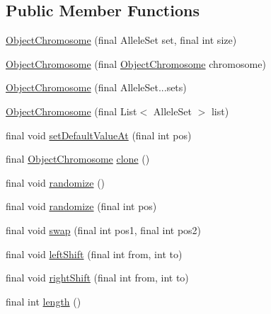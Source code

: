 \subsection*{Public Member Functions}
\begin{DoxyCompactItemize}
\item 
\hyperlink{classjenes_1_1chromosome_1_1_object_chromosome_a5af7d34bc1f7260dca1dc5c38135f4a4}{Object\-Chromosome} (final Allele\-Set set, final int size)
\item 
\hyperlink{classjenes_1_1chromosome_1_1_object_chromosome_a59e25d20fb54d53ff2b4adc53177d7d2}{Object\-Chromosome} (final \hyperlink{classjenes_1_1chromosome_1_1_object_chromosome}{Object\-Chromosome} chromosome)
\item 
\hyperlink{classjenes_1_1chromosome_1_1_object_chromosome_aba090ada4d0f24caaf6f68cfed7800f0}{Object\-Chromosome} (final Allele\-Set...\-sets)
\item 
\hyperlink{classjenes_1_1chromosome_1_1_object_chromosome_aa6c8dcc77a9129f9634ea02f19d5a968}{Object\-Chromosome} (final List$<$ Allele\-Set $>$ list)
\item 
final void \hyperlink{classjenes_1_1chromosome_1_1_object_chromosome_ad4b8a3ca38d15a8170b63464149b37aa}{set\-Default\-Value\-At} (final int pos)
\item 
final \hyperlink{classjenes_1_1chromosome_1_1_object_chromosome}{Object\-Chromosome} \hyperlink{classjenes_1_1chromosome_1_1_object_chromosome_a4aa8eeaac6a20b30c260bfda00c78fe2}{clone} ()
\item 
final void \hyperlink{classjenes_1_1chromosome_1_1_object_chromosome_a26a9d9d7eb049ff88c3321728fd9de07}{randomize} ()
\item 
final void \hyperlink{classjenes_1_1chromosome_1_1_object_chromosome_aac077d08ae00b9805797d5848a10c1f4}{randomize} (final int pos)
\item 
final void \hyperlink{classjenes_1_1chromosome_1_1_object_chromosome_af85db410fecd769993c248f94396dd53}{swap} (final int pos1, final int pos2)
\item 
final void \hyperlink{classjenes_1_1chromosome_1_1_object_chromosome_a1e1570b75182f3d244a6d857a6acb7bf}{left\-Shift} (final int from, int to)
\item 
final void \hyperlink{classjenes_1_1chromosome_1_1_object_chromosome_a584d10eceb2858e0ef88ea7f7c21d83c}{right\-Shift} (final int from, int to)
\item 
final int \hyperlink{classjenes_1_1chromosome_1_1_object_chromosome_a12ff61d91455ed5915bcf71c889ea1dd}{length} ()

\end{DoxyCompactItemize}
